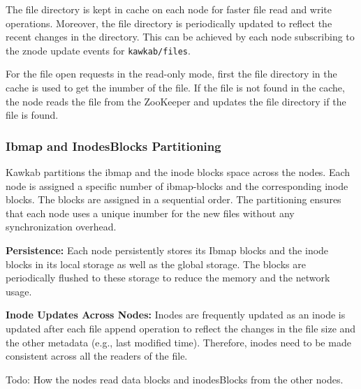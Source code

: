 \documentclass[]{article}
\newcommand{\subtopic}[1]{\vspace{1.5pt} \noindent \textbf{#1}}
\newcommand{\hl}[1]{\textcolor{hlcolor}{#1}}
\begin{document}
The file directory is kept in cache on each node for faster file read and write
operations. Moreover, the file directory is periodically updated to reflect the
recent changes in the directory. This can be achieved by each node subscribing
to the znode update events for \texttt{kawkab/files}.

For the file open requests in the read-only mode, first the file directory in
the cache is used to get the inumber of the file. If the file is not found in
the cache, the node reads the file from the ZooKeeper and updates the file
directory if the file is found.



\subsubsection{Ibmap and InodesBlocks Partitioning} Kawkab partitions the ibmap
and the inode blocks space across the nodes. Each node is assigned a specific
number of ibmap-blocks and the corresponding inode blocks.
The blocks are assigned in a sequential order. The partitioning ensures that
each node uses a unique inumber for the new files without any synchronization
overhead.

\subtopic{Persistence:} Each node persistently stores its Ibmap blocks and the
inode blocks in its local storage as well as the global storage. The blocks are
periodically flushed to these storage to reduce the memory and the network usage.

\subtopic{Inode Updates Across Nodes:} Inodes are frequently updated as an inode is
updated after each file append operation to reflect the changes in the file
size and the other metadata (e.g., last modified time).  Therefore, inodes need
to be made consistent across all the readers of the file.

\hl{Todo: How the nodes read data blocks and inodesBlocks from the other nodes.}

\end{document}
